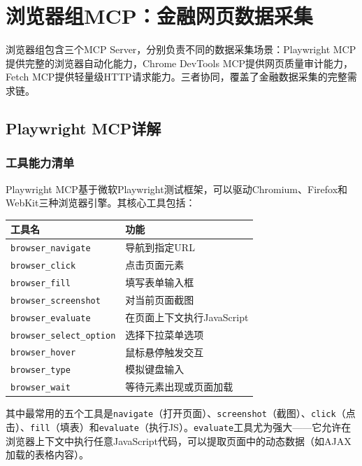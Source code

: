\section{浏览器组MCP：金融网页数据采集}

浏览器组包含三个MCP Server，分别负责不同的数据采集场景：Playwright MCP提供完整的浏览器自动化能力，Chrome DevTools MCP提供网页质量审计能力，Fetch MCP提供轻量级HTTP请求能力。三者协同，覆盖了金融数据采集的完整需求链。

\subsection{Playwright MCP详解}

\subsubsection{工具能力清单}

Playwright MCP基于微软Playwright测试框架，可以驱动Chromium、Firefox和WebKit三种浏览器引擎。其核心工具包括：

\begin{table}[H]
\centering
\begin{tabular}{lp{9cm}}
\toprule
\textbf{工具名} & \textbf{功能} \\
\midrule
\texttt{browser\_navigate} & 导航到指定URL \\
\texttt{browser\_click} & 点击页面元素 \\
\texttt{browser\_fill} & 填写表单输入框 \\
\texttt{browser\_screenshot} & 对当前页面截图 \\
\texttt{browser\_evaluate} & 在页面上下文执行JavaScript \\
\texttt{browser\_select\_option} & 选择下拉菜单选项 \\
\texttt{browser\_hover} & 鼠标悬停触发交互 \\
\texttt{browser\_type} & 模拟键盘输入 \\
\texttt{browser\_wait} & 等待元素出现或页面加载 \\
\bottomrule
\end{tabular}
\end{table}

其中最常用的五个工具是\texttt{navigate}（打开页面）、\texttt{screenshot}（截图）、\texttt{click}（点击）、\texttt{fill}（填表）和\texttt{evaluate}（执行JS）。\texttt{evaluate}工具尤为强大——它允许在浏览器上下文中执行任意JavaScript代码，可以提取页面中的动态数据（如AJAX加载的表格内容）。


